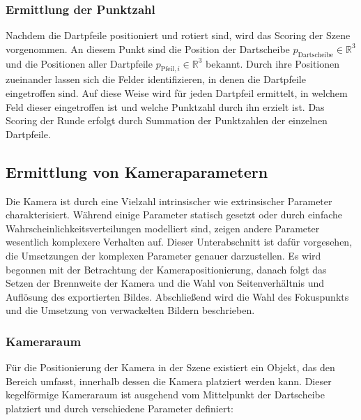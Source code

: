 \subsubsection{Ermittlung der Punktzahl}
\label{sec:dartpfeile_punktzahl}

Nachdem die Dartpfeile positioniert und rotiert sind, wird das Scoring der Szene vorgenommen. An diesem Punkt sind die Position der Dartscheibe $p_\text{Dartscheibe} \in \mathbb{R}^3$ und die Positionen aller Dartpfeile $p_{\text{Pfeil}, i} \in \mathbb{R}^3$ bekannt. Durch ihre Positionen zueinander lassen sich die Felder identifizieren, in denen die Dartpfeile eingetroffen sind. Auf diese Weise wird für jeden Dartpfeil ermittelt, in welchem Feld dieser eingetroffen ist und welche Punktzahl durch ihn erzielt ist. Das Scoring der Runde erfolgt durch Summation der Punktzahlen der einzelnen Dartpfeile.

\subsection{Ermittlung von Kameraparametern}  %
\label{sec:ermittlung_kameraparamater}

Die Kamera ist durch eine Vielzahl intrinsischer wie extrinsischer Parameter charakterisiert. Während einige Parameter statisch gesetzt oder durch einfache Wahrscheinlichkeitsverteilungen modelliert sind, zeigen andere Parameter wesentlich komplexere Verhalten auf. Dieser Unterabschnitt ist dafür vorgesehen, die Umsetzungen der komplexen Parameter genauer darzustellen. Es wird begonnen mit der Betrachtung der Kamerapositionierung, danach folgt das Setzen der Brennweite der Kamera und die Wahl von Seitenverhältnis und Auflösung des exportierten Bildes. Abschließend wird die Wahl des Fokuspunkts und die Umsetzung von verwackelten Bildern beschrieben.

\newpage
\subsubsection{Kameraraum}
\label{sec:kameraraum}

Für die Positionierung der Kamera in der Szene existiert ein Objekt, das den Bereich umfasst, innerhalb dessen die Kamera platziert werden kann. Dieser kegelförmige Kameraraum ist ausgehend vom Mittelpunkt der Dartscheibe platziert und durch verschiedene Parameter definiert:

